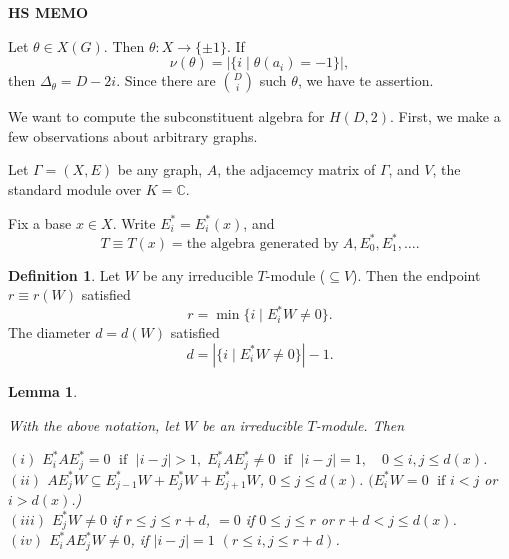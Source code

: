 \documentclass[
]{book}
\newtheorem{lemma}{Lemma}[chapter]
\theoremstyle{definition}
\newtheorem{definition}{Definition}[chapter]
\theoremstyle{definition}
\theoremstyle{definition}
\theoremstyle{definition}
\theoremstyle{remark}
\begin{document}
\textbf{HS MEMO}

Let \(\theta \in X(G)\). Then \(\theta: X \to \{\pm 1\}\). If
\[\nu(\theta) = |\{i\mid \theta(a_i) = -1\}|, \]
then \(\Delta_\theta = D-2i\). Since there are \(\binom{D}{i}\) such \(\theta\), we have te assertion.

We want to compute the subconstituent algebra for \(H(D,2)\). First, we make a few observations about arbitrary graphs.

Let \(\Gamma = (X,E)\) be any graph, \(A\), the adjacemcy matrix of \(\Gamma\), and \(V\), the standard module over \(K = \mathbb{C}\).

Fix a base \(x\in X\). Write \(E_i^* = E_i^*(x)\), and
\[T \equiv T(x) = \text{the algebra generated by}\; A, E_0^*, E_1^*, \ldots .\]

\begin{definition}
\protect\hypertarget{def:rd}{}\label{def:rd}Let \(W\) be any irreducible \(T\)-module (\(\subseteq V\)). Then the endpoint \(r \equiv r(W)\) satisfied
\[r = \min\{i\mid E_i^*W \neq 0\}.\]
The diameter \(d = d(W)\) satisfied
\[d = |\{i\mid E_i^*W \neq 0\}| - 1.\]
\end{definition}

\begin{lemma}
\protect\hypertarget{lem:irreducible}{}\label{lem:irreducible}

With the above notation, let \(W\) be an irreducible \(T\)-module. Then

\((i)\) \(E_i^*AE_j^* = 0 \; \text{ if }\; |i-j|>1, \; E_i^*AE_j^*\neq 0 \; \text{ if }\; |i-j| = 1, \quad 0\leq i,j\leq d(x)\).\\
\((ii)\) \(AE_j^*W \subseteq E_{j-1}^*W + E_j^*W + E^*_{j+1}W\), \(0\leq j \leq d(x)\). \((E_i^*W = 0 \; \text{ if } i<j\) or \(i > d(x)\).)\\
\((iii)\) \(E^*_jW \neq 0\) if \(r\leq j \leq r+d\), \(=0\) if \(0\leq j\leq r\) or \(r+d < j \leq d(x)\).\\
\((iv)\) \(E_i^*AE^*_jW \neq 0\), if \(|i-j| = 1\) \((r \leq i,j \leq r+d)\).

\end{lemma}
\end{document}
